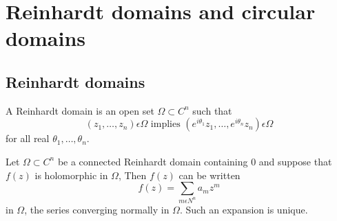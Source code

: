 

\chapter{Reinhardt domains and circular domains}\label{chap2}

\section{Reinhardt domains}\label{chap2:sec1}\pageoriginale

\begin{defi*}
A Reinhardt domain is an open set $\Omega \subset C^n$ such that 
$$
(z_1, \ldots, z_n) \epsilon \Omega \text{ implies } (e^{i\theta_1} z_1,
\ldots, e^{i\theta_n} z_n) \epsilon \Omega
$$
for all real $\theta_1, \ldots, \theta_n$.
\end{defi*}

\begin{thm}\label{chap2:thm1}
Let $\Omega \subset C^n$ be a connected Reinhardt domain containing 0
and suppose that $f(z)$ is holomorphic in $\Omega$, Then $f(z)$ can be
written 
$$
f(z) = \sum\limits_{m\epsilon N^n} a_m z^m
$$
in $\Omega$, the series converging normally in $\Omega$. Such an
expansion is unique.
\end{thm}

